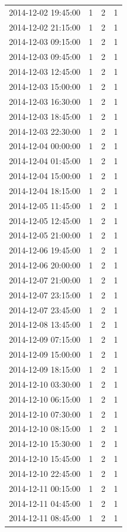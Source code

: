 \begin{tabular}{lrrr}
2014-12-02 19:45:00 & 1 & 2 & 1 \\
2014-12-02 21:15:00 & 1 & 2 & 1 \\
2014-12-03 09:15:00 & 1 & 2 & 1 \\
2014-12-03 09:45:00 & 1 & 2 & 1 \\
2014-12-03 12:45:00 & 1 & 2 & 1 \\
2014-12-03 15:00:00 & 1 & 2 & 1 \\
2014-12-03 16:30:00 & 1 & 2 & 1 \\
2014-12-03 18:45:00 & 1 & 2 & 1 \\
2014-12-03 22:30:00 & 1 & 2 & 1 \\
2014-12-04 00:00:00 & 1 & 2 & 1 \\
2014-12-04 01:45:00 & 1 & 2 & 1 \\
2014-12-04 15:00:00 & 1 & 2 & 1 \\
2014-12-04 18:15:00 & 1 & 2 & 1 \\
2014-12-05 11:45:00 & 1 & 2 & 1 \\
2014-12-05 12:45:00 & 1 & 2 & 1 \\
2014-12-05 21:00:00 & 1 & 2 & 1 \\
2014-12-06 19:45:00 & 1 & 2 & 1 \\
2014-12-06 20:00:00 & 1 & 2 & 1 \\
2014-12-07 21:00:00 & 1 & 2 & 1 \\
2014-12-07 23:15:00 & 1 & 2 & 1 \\
2014-12-07 23:45:00 & 1 & 2 & 1 \\
2014-12-08 13:45:00 & 1 & 2 & 1 \\
2014-12-09 07:15:00 & 1 & 2 & 1 \\
2014-12-09 15:00:00 & 1 & 2 & 1 \\
2014-12-09 18:15:00 & 1 & 2 & 1 \\
2014-12-10 03:30:00 & 1 & 2 & 1 \\
2014-12-10 06:15:00 & 1 & 2 & 1 \\
2014-12-10 07:30:00 & 1 & 2 & 1 \\
2014-12-10 08:15:00 & 1 & 2 & 1 \\
2014-12-10 15:30:00 & 1 & 2 & 1 \\
2014-12-10 15:45:00 & 1 & 2 & 1 \\
2014-12-10 22:45:00 & 1 & 2 & 1 \\
2014-12-11 00:15:00 & 1 & 2 & 1 \\
2014-12-11 04:45:00 & 1 & 2 & 1 \\
2014-12-11 08:45:00 & 1 & 2 & 1 \\

\end{tabular}
